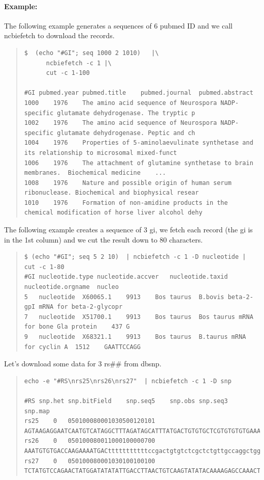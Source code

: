 \documentclass[12pt]{article}
\begin{document}
\paragraph{Example:}
The following example generates a sequences of 6 pubmed ID and we call ncbiefetch to download the records.
\begin{quote}
\begin{verbatim}
$  (echo "#GI"; seq 1000 2 1010)   |\
      ncbiefetch -c 1 |\
      cut -c 1-100

#GI	pubmed.year	pubmed.title	pubmed.journal	pubmed.abstract
1000	1976	The amino acid sequence of Neurospora NADP-specific glutamate dehydrogenase. The tryptic p
1002	1976	The amino acid sequence of Neurospora NADP-specific glutamate dehydrogenase. Peptic and ch
1004	1976	Properties of 5-aminolaevulinate synthetase and its relationship to microsomal mixed-funct
1006	1976	The attachment of glutamine synthetase to brain membranes.	Biochemical medicine	...
1008	1976	Nature and possible origin of human serum ribonuclease.	Biochemical and biophysical resear
1010	1976	Formation of non-amidine products in the chemical modification of horse liver alcohol dehy
\end{verbatim}
\end{quote}

The following example creates a sequence of 3 gi, we fetch each record (the gi is in the 1st column) and we cut the result down to 80 characters.

\begin{quote}
\begin{verbatim}
$ (echo "#GI"; seq 5 2 10)  | ncbiefetch -c 1 -D nucleotide | cut -c 1-80
#GI	nucleotide.type	nucleotide.accver	nucleotide.taxid	nucleotide.orgname	nucleo
5	nucleotide	X60065.1	9913	Bos taurus	B.bovis beta-2-gpI mRNA for beta-2-glycopr
7	nucleotide	X51700.1	9913	Bos taurus	Bos taurus mRNA for bone Gla protein	437	G
9	nucleotide	X68321.1	9913	Bos taurus	B.taurus mRNA for cyclin A	1512	GAATTCCAGG
\end{verbatim}
\end{quote}

Let's download some data for 3 rs\#\# from dbsnp.
\begin{quote}
\begin{verbatim}
echo -e "#RS\nrs25\nrs26\nrs27"  | ncbiefetch -c 1 -D snp

#RS	snp.het	snp.bitField	snp.seq5	snp.obs	snp.seq3	snp.map
rs25	0	050100080001030500120101	AGTAAGAGGAATCAATGTCATAGGCTTTAGATAGCATTTATGACTGTGTGCTCGTGTGTGTGAAAACT..
rs26	0	050100080011000100000700	AAATGTGTGACCAAGAAAATGACtttttttttttccgactgtgtctcgctctgttgccaggctggagt..
rs27	0	050100080001030100100100	TCTATGTCCAGAACTATGGATATATATTGACCTTAACTGTCAAGTATATACAAAAGAGCCAAACTGCA..
\end{verbatim}
\end{quote}
\end{document}
